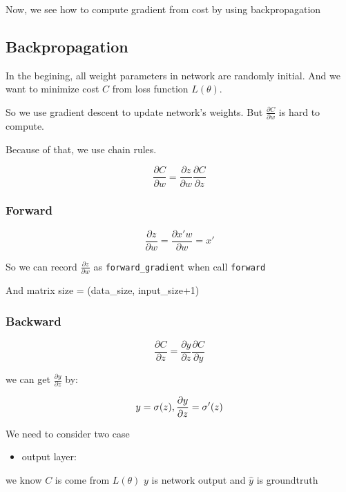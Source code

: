 \documentclass[11pt]{article}
\providecommand{\tightlist}{%
      \setlength{\itemsep}{0pt}\setlength{\parskip}{0pt}}
\begin{document}
Now, we see how to compute gradient from cost by using backpropagation

    \hypertarget{backpropagation}{%
\subsection{Backpropagation}\label{backpropagation}}

In the begining, all weight parameters in network are randomly initial.
And we want to minimize cost \(C\) from loss function \(L(\theta)\).

So we use gradient descent to update network's weights. But
\(\frac{\partial C}{\partial w}\) is hard to compute.

Because of that, we use chain rules.

\[\frac{\partial C}{\partial w} = \frac{\partial z}{\partial w}\frac{\partial C}{\partial z}\]

\hypertarget{forward}{%
\subsubsection{Forward}\label{forward}}

\[\frac{\partial z}{\partial w} = \frac{\partial x'w}{\partial w} = x'\]

So we can record \(\frac{\partial z}{\partial w}\) as
\texttt{forward\_gradient} when call \texttt{forward}

And matrix size = (data\_size, input\_size+1)

\hypertarget{backward}{%
\subsubsection{Backward}\label{backward}}

\[\frac{\partial C}{\partial z} = \frac{\partial y}{\partial z}\frac{\partial C}{\partial y}\]

we can get \(\frac{\partial y}{\partial z}\) by:

\[y = \sigma(z), \space \frac{\partial y}{\partial z}=\sigma'(z)\]

We need to consider two case

\begin{itemize}
\tightlist
\item
  output layer:
\end{itemize}

we know \(C\) is come from \(L(\theta)\) \(y\) is network output and
\(\hat{y}\) is groundtruth
\end{document}
